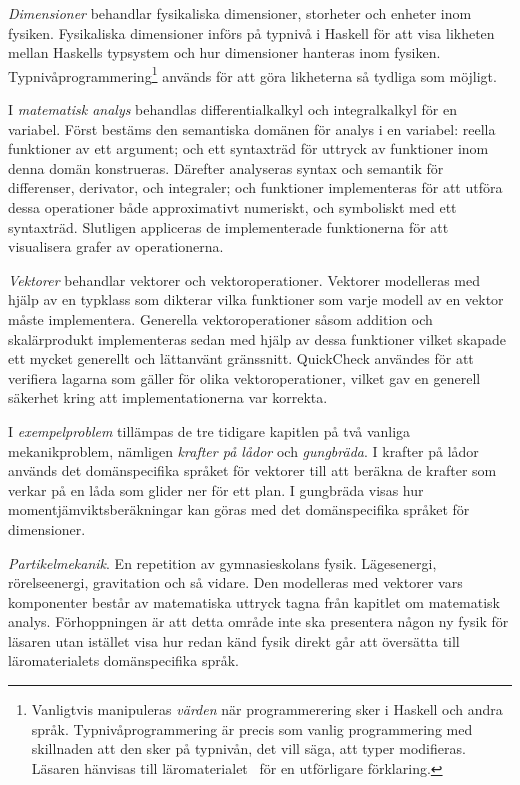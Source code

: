 \textit{Dimensioner} behandlar fysikaliska dimensioner, storheter och enheter inom fysiken.
Fysikaliska dimensioner införs på typnivå i Haskell för att visa likheten mellan
Haskells typsystem och hur dimensioner hanteras inom fysiken.
Typnivåprogrammering\footnote{Vanligtvis manipuleras \textit{värden} när
programmerering sker i Haskell och andra språk. Typnivåprogrammering är precis som
vanlig programmering med skillnaden att den sker på typnivån, det vill säga, att
typer modifieras. Läsaren hänvisas till läromaterialet~\cite{LYAP} för en utförligare
förklaring.} används för att göra likheterna så tydliga som möjligt.

I \textit{matematisk analys} behandlas differentialkalkyl och
integralkalkyl för en variabel. Först bestäms den semantiska domänen
för analys i en variabel: reella funktioner av ett argument; och ett syntaxträd
för uttryck av funktioner inom denna domän konstrueras. Därefter
analyseras syntax och semantik för differenser, derivator, och
integraler; och funktioner implementeras för att utföra dessa
operationer både approximativt numeriskt, och symboliskt med ett
syntaxträd. Slutligen appliceras de implementerade funktionerna för
att visualisera grafer av operationerna.

\textit{Vektorer} behandlar vektorer och vektoroperationer. Vektorer modelleras
med hjälp av en typklass som dikterar vilka funktioner som varje
modell av en vektor måste implementera. Generella vektoroperationer såsom
addition och skalärprodukt implementeras sedan med hjälp av dessa funktioner
vilket skapade ett mycket generellt och lättanvänt gränssnitt. QuickCheck
användes för att verifiera lagarna som gäller för olika vektoroperationer,
vilket gav en generell säkerhet kring att implementationerna var korrekta.

I \textit{exempelproblem} tillämpas de tre tidigare kapitlen på två vanliga
mekanikproblem, nämligen \textit{krafter på lådor} och \textit{gungbräda}. I
krafter på lådor används det domänspecifika språket för vektorer till att
beräkna de krafter som verkar på en låda som glider ner för ett plan. I
gungbräda visas hur momentjämviktsberäkningar kan göras med det domänspecifika
språket för dimensioner.

\textit{Partikelmekanik}. En repetition av gymnasieskolans fysik.
Lägesenergi, rörelseenergi, gravitation och så vidare. Den modelleras med vektorer vars
komponenter består av matematiska uttryck tagna från kapitlet om matematisk
analys. Förhoppningen är att detta område inte ska presentera någon ny fysik för
läsaren utan istället visa hur redan känd fysik direkt går att översätta till
läromaterialets domänspecifika språk.

